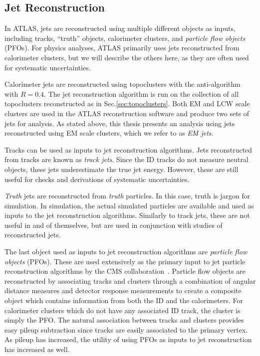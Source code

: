 \subsection{Jet Reconstruction}

In ATLAS, jets are reconstructed using multiple different objects as inputs, including tracks, ``truth'' objects, calorimeter clusters, and \textit{particle flow objects} (PFOs).
For physics analyses, ATLAS primarily uses jets reconstructed from calorimeter clusters, but we will describe the others here, as they are often used for systematic uncertainties.

Calorimeter jets are reconstructed using topoclusters with the anti-\kt algorithm with $R = 0.4$.
The jet reconstruction algorithm is run on the collection of all topoclusters reconstructed as in Sec.\ref{sec:topoclusters}.
Both EM and LCW scale clusters are used in the ATLAS reconstruction software and produce two sets of jets for analysis.
As stated above, this thesis presents an analysis using jets reconstructed using EM scale clusters, which we refer to as \textit{EM jets}.

Tracks can be used as inputs to jet reconstruction algorithms.
Jets reconstructed from tracks are known as \textit{track jets}.
Since the ID tracks do not measure neutral objects, these jets underestimate the true jet energy.
However, these are still useful for checks and derivations of systematic uncertainties.

\textit{Truth} jets are reconstructed from \textit{truth} particles.
In this case, truth is jargon for simulation.
In simulation, the actual simulated particles are available and used as inputs to the jet reconstruction algorithms.
Similarly to track jets, these are not useful in and of themselves, but are used in conjunction with studies of reconstructed jets.

The last object used as inputs to jet reconstruction algorithms are \textit{particle flow objects} (PFOs).
These are used extensively as the primary input to jet particle reconstruction algorithms by the CMS collaboration~\cite{CMS:2009nxa}.
Particle flow objects are reconstructed by associating tracks and clusters through a combination of angular distance measures and detector response measurements to create a composite object which contains information from both the ID and the calorimeters.
For calorimeter clusters which do not have any associated ID track, the cluster is simply the PFO.
The natural association between tracks and clusters provides easy pileup subtraction since tracks are easily associated to the primary vertex.
As pileup has increased, the utility of using PFOs as inputs to jet reconstruction has increased as well.


